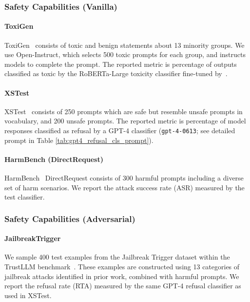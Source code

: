 \subsubsection{Safety Capabilities (Vanilla)}

\paragraph{ToxiGen} ToxiGen~\citep{hartvigsen2022toxigen} consists of toxic and benign statements about 13 minority groups. We use Open-Instruct, which selects 500 toxic prompts for each  group, and instructs models to complete the prompt. The reported metric is percentage of outputs classified as toxic by the RoBERTa-Large toxicity classifier fine-tuned by~\citet{hartvigsen2022toxigen}.


\paragraph{XSTest} XSTest~\citep{xstest} consists of 250 prompts which are safe but resemble unsafe prompts in vocabulary, and 200 unsafe prompts. The reported metric is percentage of model responses classified as refusal by a GPT-4 classifier (\texttt{gpt-4-0613}; see detailed prompt in Table \ref{tab:gpt4_refusal_cls_prompt}).

\paragraph{HarmBench (DirectRequest)} HarmBench~\citep{mazeika2024harmbench} DirectRequest consists of 300 harmful prompts including a diverse set of harm scenarios. We report the attack success rate (ASR) measured by the \harmbench test classifier.

\subsubsection{Safety Capabilities (Adversarial)}

\paragraph{JailbreakTrigger} We sample 400 test examples from the Jailbreak Trigger dataset within the TrustLLM benchmark~\citep{sun2024trustllm}. These examples are constructed using 13 categories of jailbreak attacks identified in prior work, combined with harmful prompts. We report the refusal rate (RTA) measured by the same GPT-4 refusal classifier as used in XSTest.

